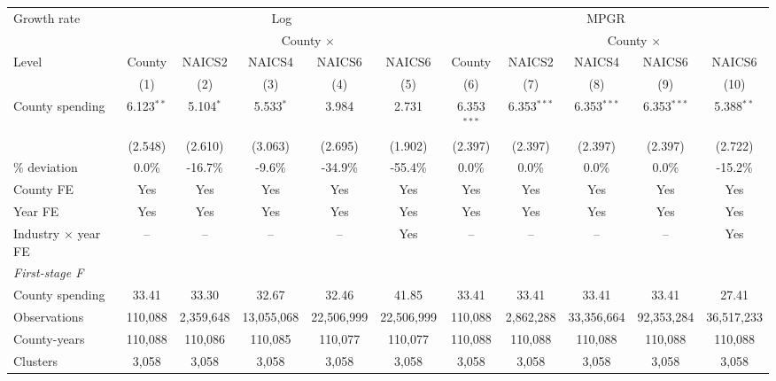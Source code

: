 \begin{tabular*}{\linewidth}{@{\extracolsep{\fill}}lcccccccccc@{}}
\toprule
Growth rate & \multicolumn{5}{c}{Log} & \multicolumn{5}{c}{MPGR} \\
\cmidrule(lr){2-6}\cmidrule(lr){7-11}
 &  & \multicolumn{4}{c}{County $\times$} &  & \multicolumn{4}{c}{County $\times$} \\
Level & County & NAICS2 & NAICS4 & NAICS6 & NAICS6 & County & NAICS2 & NAICS4 & NAICS6 & NAICS6 \\
 & (1) & (2) & (3) & (4) & (5) & (6) & (7) & (8) & (9) & (10) \\
\midrule
County spending & 6.123$^{**}$ & 5.104$^{*}$ & 5.533$^{*}$ & 3.984 & 2.731 & 6.353$^{***}$ & 6.353$^{***}$ & 6.353$^{***}$ & 6.353$^{***}$ & 5.388$^{**}$ \\
 & (2.548) & (2.610) & (3.063) & (2.695) & (1.902) & (2.397) & (2.397) & (2.397) & (2.397) & (2.722) \\
\% deviation & 0.0\% & -16.7\% & -9.6\% & -34.9\% & -55.4\% & 0.0\% & 0.0\% & 0.0\% & 0.0\% & -15.2\% \\
\addlinespace[4pt]
County FE & Yes & Yes & Yes & Yes & Yes & Yes & Yes & Yes & Yes & Yes \\
Year FE & Yes & Yes & Yes & Yes & Yes & Yes & Yes & Yes & Yes & Yes \\
Industry $\times$ year FE & -- & -- & -- & -- & Yes & -- & -- & -- & -- & Yes \\
\addlinespace[4pt]
\textit{First-stage F} &  &  &  &  &  &  &  &  &  &  \\
\hspace{1em}County spending & 33.41 & 33.30 & 32.67 & 32.46 & 41.85 & 33.41 & 33.41 & 33.41 & 33.41 & 27.41 \\
\addlinespace[7pt]
Observations & 110,088 & 2,359,648 & 13,055,068 & 22,506,999 & 22,506,999 & 110,088 & 2,862,288 & 33,356,664 & 92,353,284 & 36,517,233 \\
County-years & 110,088 & 110,086 & 110,085 & 110,077 & 110,077 & 110,088 & 110,088 & 110,088 & 110,088 & 110,088 \\
Clusters & 3,058 & 3,058 & 3,058 & 3,058 & 3,058 & 3,058 & 3,058 & 3,058 & 3,058 & 3,058 \\
\bottomrule\end{tabular*}
